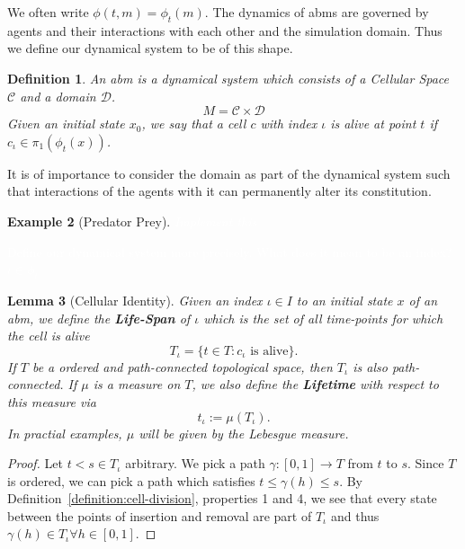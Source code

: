 \documentclass{article}
\newcommand{\todo}[1]{\colorbox{WildStrawberry}{\textcolor{white}{#1}}}
\newtheorem{definition}{Definition}[section]
\newtheorem{example}[definition]{Example}
\newtheorem{lemma}[definition]{Lemma}
\begin{document}
We often write $\phi(t,m) = \phi_t(m)$.
The dynamics of \acp{abm} are governed by agents and their interactions with each other and the
simulation domain.
Thus we define our dynamical system to be of this shape.

\begin{definition}
    An \ac{abm} is a dynamical system which consists of a Cellular Space $\mathscr{C}$ and a domain
    $\mathscr{D}$.
    \begin{equation}
        M = \mathscr{C}\times\mathscr{D}
    \end{equation}
    Given an initial state $x_0$, we say that a cell $c$ with index $\iota$ is alive at point $t$ if
    $c_\iota\in\pi_1(\phi_t(x))$.
\end{definition}

It is of importance to consider the domain as part of the dynamical system such that interactions
of the agents with it can permanently alter its constitution.

\begin{example}[Predator Prey]
    \todo{Implement this}
\end{example}


\todo{Define our dynamical system more precisely. What does it mean to be an index?
$\iota\in\phi_t$}

\begin{lemma}[Cellular Identity]
    \label{thm:cellular-uniqueness}
    Given an index $\iota\in I$ to an initial state $x$ of an \ac{abm}, we define the
    \textbf{Life-Span} of $\iota$ which is the set of all time-points for which the cell is alive
    \begin{equation}
        T_\iota=\{t\in T: c_\iota \text{ is alive}\}.
    \end{equation}
    If $T$ be a ordered and path-connected topological space, then $T_\iota$ is also path-connected.
    If $\mu$ is a measure on $T$, we also define the \textbf{Lifetime} with respect to this measure
    via
    \begin{equation}
        t_\iota:=\mu\left(T_\iota\right).
    \end{equation}
    In practial examples, $\mu$ will be given by the Lebesgue measure.
\end{lemma}
\begin{proof}
    Let $t<s\in T_\iota$ arbitrary.
    We pick a path $\gamma:[0,1]\rightarrow T$ from $t$ to $s$.
    Since $T$ is ordered, we can pick a path which satisfies $t\leq\gamma(h)\leq s$.
    By Definition~\ref{definition:cell-division}, properties 1 and 4, we see that every state
    between the points of insertion and removal are part of $T_\iota$ and thus
    $\gamma(h)\in T_\iota\forall h\in [0,1]$.
\end{proof}
\end{document}

